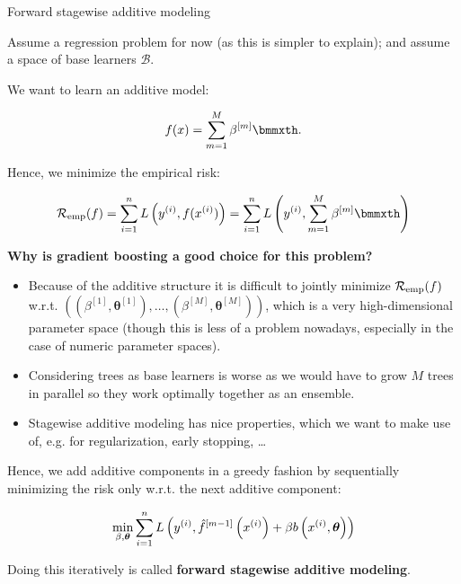 \begin{vbframe}{Forward stagewise additive modeling}

Assume a regression problem for now (as this is simpler to explain);
and assume a space of base learners $\mathcal{B}$.

\lz



We want to learn an additive model:

$$
\fx = \sum_{m=1}^M \betam \bmmxth.
$$

Hence, we minimize the empirical risk:

$$
\riskef = \sum_{i=1}^n L\left(\yi,\fxi \right) =
\sum_{i=1}^n L\left(\yi, \sum_{m=1}^M \betam \bmmxth\right)
$$







\framebreak
\textbf{Why is gradient boosting a good choice for this problem?}
\begin{itemize}
\item Because of the additive structure it is difficult to jointly minimize $\mathcal{R}_{\text{emp}}(f)$ w.r.t. $\left(\left(\beta^{[1]}, \bm{\theta}^{[1]}\right), \ldots, \left(\beta^{[M]}, \bm{\theta}^{[M]}\right)\right)$, which is a very high-dimensional parameter space (though this is less of a problem nowadays, especially in the
case of numeric parameter spaces).
\item Considering trees as base learners is worse as we would have to grow $M$ trees in parallel so they
  work optimally together as an ensemble.
\item Stagewise additive modeling has nice properties, which we want to make use of, e.g. for regularization, early stopping, \dots
\end{itemize}

\framebreak

Hence, we add additive components in a greedy fashion by sequentially minimizing the risk only w.r.t. the next additive component:

$$ \min \limits_{\beta, \bm{\theta}} \sum_{i=1}^n L\left(y^{(i)}, \hat{f}^{[m-1]}\left(x^{(i)}\right) + \beta b\left(x^{(i)}, \bm{\theta}\right)\right) $$

\lz

Doing this iteratively is called \textbf{forward stagewise additive modeling}.



\end{vbframe}


